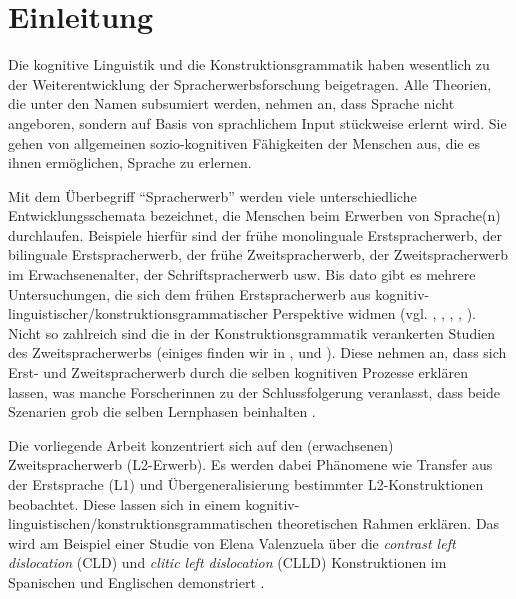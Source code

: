 \section{Einleitung}

\begin{comment}
* ca 3/4 Seiten
* Untersuchungsgegenstand
* Erkenntnisinteresse
* Forschungsstand
* Vorgehensweise: also Section 2 macht blabla, Section 3 blablup, ....
* Ergebnisse können/sollen angedeuten werden
\end{comment}

Die kognitive Linguistik und die Konstruktionsgrammatik haben wesentlich zu der Weiterentwicklung der Spracherwerbsforschung beigetragen.
Alle Theorien, die unter den Namen subsumiert werden, nehmen an, dass Sprache nicht angeboren, sondern auf Basis von sprachlichem Input stückweise erlernt wird.
Sie gehen von allgemeinen sozio-kognitiven Fähigkeiten der Menschen aus, die es ihnen ermöglichen, Sprache zu erlernen.

Mit dem Überbegriff ``Spracherwerb'' werden viele unterschiedliche Entwicklungsschemata bezeichnet, die Menschen beim Erwerben von Sprache(n) durchlaufen.
Beispiele hierfür sind der frühe monolinguale Erstspracherwerb, der bilinguale Erstspracherwerb, der frühe Zweitspracherwerb, der Zweitspracherwerb im Erwachsenenalter, der Schriftspracherwerb usw.
Bis dato gibt es mehrere Untersuchungen, die sich dem frühen Erstspracherwerb aus kognitiv-linguistischer/konstruktionsgrammatischer Perspektive widmen (vgl. \cite{Brooks99}, \cite{Tomasello01}, \cite{Lieven03}, \cite{Tomasello03}, \cite{Tomasello06}).
Nicht so zahlreich sind die in der Konstruktionsgrammatik verankerten Studien des Zweitspracherwerbs (einiges finden wir in \cite[][]{Ellis04}, \cite[][]{Eskildsen08} und \cite[][]{Haberzettl06}).
Diese nehmen an, dass sich Erst- und Zweitspracherwerb durch die selben kognitiven Prozesse erklären lassen, was manche Forscherinnen zu der Schlussfolgerung veranlasst, dass beide Szenarien grob die selben Lernphasen beinhalten \cite[][]{Ellis08}.

Die vorliegende Arbeit konzentriert sich auf den (erwachsenen) Zweitspracherwerb (L2-Erwerb).
Es werden dabei Phänomene wie Transfer aus der Erstsprache (L1) und Übergeneralisierung bestimmter L2-Konstruktionen beobachtet.
Diese lassen sich in einem kognitiv-linguistischen/konstruktionsgrammatischen theoretischen Rahmen erklären.
Das wird am Beispiel einer Studie von Elena Valenzuela über die \textit{contrast left dislocation} (CLD) und \textit{clitic left dislocation} (CLLD) Konstruktionen im Spanischen und Englischen demonstriert \cite[][]{Valenzuela05}.

